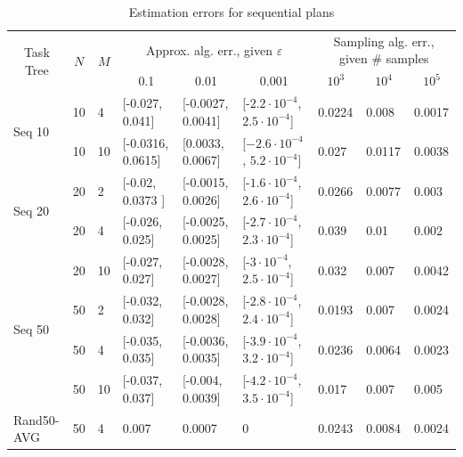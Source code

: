 \documentclass{article}
\begin{document}
\begin{table}[tbh!]
	{\footnotesize
		\begin{tabular}{|l|l|l|| p{1.5cm}|p{1.5cm}|p{2.4cm}||l|l|l|}
			\hline
			\multicolumn{1}{|c|}{\multirow{2}{*}{Task Tree}} & \multicolumn{1}{c|}{\multirow{2}{*}{$N$}} & \multicolumn{1}{c|}{\multirow{2}{*}{$M$}} & \multicolumn{3}{c|}{Approx. alg. err., given $\varepsilon$} & \multicolumn{3}{c|}{Sampling alg. err., given \# samples} \\ \cline{4-9} 
			\multicolumn{1}{|c|}{} & \multicolumn{1}{c|}{} & \multicolumn{1}{c|}{} & \multicolumn{1}{c|}{0.1} & \multicolumn{1}{c|}{0.01} & \multicolumn{1}{c|}{0.001} & \multicolumn{1}{c|}{$10^{3}$} & \multicolumn{1}{c|}{$10^{4}$} & \multicolumn{1}{c|}{$10^{5}$} \\ \hline \hline
			\multirow{2}{*}{Seq 10} & 10 & 4 & [-0.027, 0.041] & [-0.0027, 0.0041] & [-$2.2 {\cdot} 10^{-4}$, $2.5 {\cdot} 10^{-4}$] & 0.0224 & 0.008 & 0.0017  \\ \cline{2-9} 
			& 10 & 10 &[-0.0316, 0.0615]  & [0.0033, 0.0067] & [$-2.6 {\cdot} 10^{-4}$, $5.2 {\cdot} 10^{-4}$] & 0.027 & 0.0117 & 0.0038  \\ \hline 
			\multirow{2}{*}{Seq 20} & 20 & 2 & [-0.02, 0.0373 ] & [-0.0015, 0.0026] & [-$1.6 {\cdot} 10^{-4}$, $2.6 {\cdot} 10^{-4}$]  & 0.0266 & 0.0077 &  0.003   \\ \cline{2-9} 
			& 20 & 4 & [-0.026, 0.025] & [-0.0025, 0.0025]  & [-$2.7{\cdot} 10^{-4}$, $2.3 {\cdot} 10^{-4}$] & 0.039 & 0.01 & 0.002 \\ \cline{2-9} 
			& 20 & 10   & [-0.027, 0.027] & [-0.0028, 0.0027] & [-$3 {\cdot} 10^{-4}$, $2.5 {\cdot} 10^{-4}$] & 0.032 & 0.007 & 0.0042  \\ \hline
			\multirow{2}{*}{Seq 50} & 50 & 2 & [-0.032, 0.032] & [-0.0028, 0.0028] & [-$2.8 {\cdot} 10^{-4}$, $2.4 {\cdot} 10^{-4}$]  & 0.0193 & 0.007 & 0.0024  \\ \cline{2-9}  
			& 50 & 4  & [-0.035, 0.035]  & [-0.0036, 0.0035] &[-$3.9 {\cdot} 10^{-4}$, $3.2 {\cdot} 10^{-4}$]  & 0.0236 & 0.0064 & 0.0023 \\ \cline{2-9}  
			& 50 & 10  & [-0.037, 0.037] & [-0.004, 0.0039] & [-$4.2 {\cdot} 10^{-4}$, $3.5 {\cdot} 10^{-4}$] & 0.017 & 0.007  & 0.005  \\ \hline
			\multirow{1}{*}{Rand50-AVG} & 50 & 4 & 0.007 & 0.0007 &  0 & 0.0243 & 0.0084 & 0.0024 \\   \hline
			
		\end{tabular}
		\caption{Estimation errors for sequential plans}
		\label{tab:errors2}
	}
\end{table}
\end{document}
